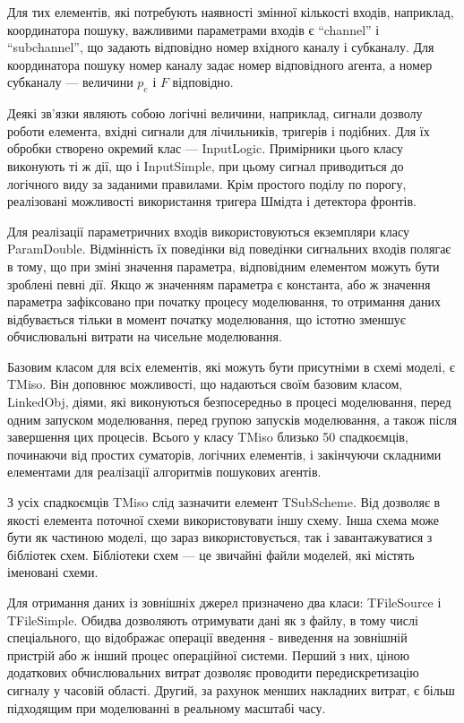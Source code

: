 Для тих елементів, які потребують наявності змінної
кількості входів, наприклад, координатора пошуку, важливими
параметрами входів є ``channel'' і ``subchannel'', що задають відповідно
номер вхідного каналу і субканалу. Для координатора пошуку
номер каналу задає номер відповідного агента, а номер субканалу
--- величини $ p_e $ і $ F $ відповідно.

Деякі зв'язки являють собою логічні величини, наприклад, сигнали
дозволу роботи елемента, вхідні сигнали для лічильників,
тригерів і подібних. Для їх обробки створено окремий клас ---
InputLogic. Примірники цього класу виконують ті ж дії, що і InputSimple,
при цьому сигнал приводиться до логічного виду за заданими
правилами. Крім простого поділу по порогу, реалізовані
можливості використання тригера Шмідта і детектора фронтів.

Для реалізації параметричних входів використовуються
екземпляри класу ParamDouble. Відмінність їх поведінки від
поведінки сигнальних входів полягає в тому, що при зміні
значення параметра, відповідним елементом можуть бути
зроблені певні дії. Якщо ж значенням параметра є константа,
або ж значення параметра зафіксовано при початку процесу
моделювання, то отримання даних відбувається тільки в момент
початку моделювання, що істотно зменшує обчислювальні витрати
на чисельне моделювання.

Базовим класом для всіх елементів, які можуть бути присутніми
в схемі моделі, є TMiso. Він доповнює можливості, що надаються
своїм базовим класом, LinkedObj, діями, які виконуються безпосередньо
в процесі моделювання, перед одним запуском моделювання, перед
групою запусків моделювання, а також після завершення цих
процесів. Всього у класу TMiso близько 50 спадкоємців, починаючи від
простих суматорів, логічних елементів, і закінчуючи складними
елементами для реалізації алгоритмів пошукових агентів.

З усіх спадкоємців TMiso слід зазначити елемент TSubScheme. Від
дозволяє в якості елемента поточної схеми використовувати
іншу схему. Інша схема може бути як частиною моделі, що
зараз використовується, так і завантажуватися з бібліотек
схем. Бібліотеки схем --- це звичайні файли моделей, які містять
іменовані схеми.

Для отримання даних із зовнішніх джерел призначено два
класи: TFileSource і TFileSimple. Обидва дозволяють отримувати дані як
з файлу, в тому числі спеціального, що відображає операції
введення - виведення на зовнішній пристрій або ж інший
процес операційної системи. Перший з них, ціною додаткових
обчислювальних витрат дозволяє проводити передискретизацію
сигналу у часовій області. Другий, за рахунок менших накладних
витрат, є більш підходящим при моделюванні в реальному масштабі
часу.

